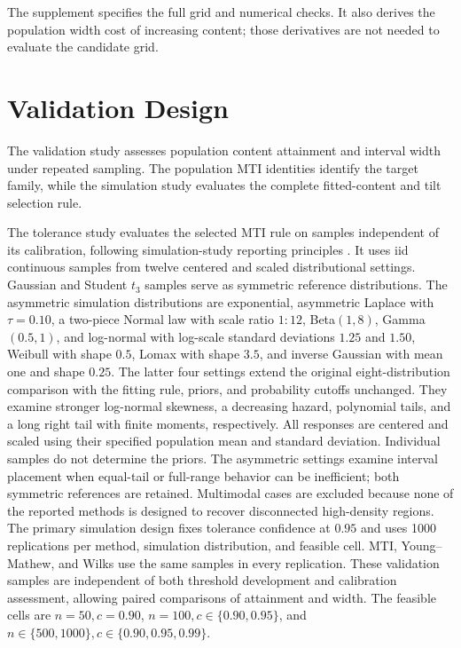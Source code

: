 \documentclass[11pt]{article}
\numberwithin{equation}{section}
\begin{document}
The supplement specifies the full grid and numerical checks. It also derives
the population width cost of increasing content; those derivatives are not
needed to evaluate the candidate grid.

\section{Validation Design}
\label{sec:evaluation}

The validation study assesses population content attainment and interval width
under repeated sampling. The population MTI identities identify the target
family, while the simulation study evaluates the complete fitted-content and
tilt selection rule.

The tolerance study evaluates the selected MTI rule on samples independent
of its calibration, following simulation-study reporting principles
\citep{MorrisWhiteCrowther2019Simulation}. It uses iid continuous samples from
twelve centered and scaled distributional settings. Gaussian and Student \(t_3\)
samples serve as symmetric reference distributions. The asymmetric simulation
distributions are exponential,
asymmetric Laplace with \(\tau=0.10\), a two-piece Normal law with scale ratio
\(1{:}12\), Beta\((1,8)\), Gamma\((0.5,1)\), and log-normal with log-scale
standard deviations \(1.25\) and \(1.50\), Weibull with shape \(0.5\),
Lomax with shape \(3.5\), and inverse Gaussian with mean one and shape
\(0.25\). The latter four settings extend the original eight-distribution
comparison with the fitting rule, priors, and probability cutoffs unchanged.
They examine stronger log-normal skewness, a decreasing hazard, polynomial
tails, and a long right tail with finite moments, respectively. All responses
are centered and scaled using their specified population mean and standard
deviation. Individual samples do not determine the priors. The asymmetric
settings examine interval placement when equal-tail or full-range behavior
can be inefficient; both symmetric references are retained.
Multimodal cases are excluded because none of the reported methods is designed
to recover disconnected high-density regions.
The primary simulation design fixes tolerance confidence at \(0.95\) and uses
1000 replications per method, simulation distribution, and feasible cell.
MTI, Young--Mathew, and Wilks use the same samples in every replication.
These validation samples are independent of both threshold development and
calibration assessment, allowing paired comparisons of attainment and width.
The feasible cells are \(n=50,c=0.90\), \(n=100,c\in\{0.90,0.95\}\), and
\(n\in\{500,1000\},c\in\{0.90,0.95,0.99\}\).
\end{document}
